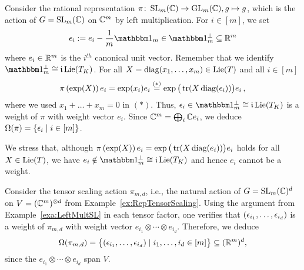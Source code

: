 

\begin{example}  \label{exa:LeftMultSL}
	Consider the rational representation $\pi \colon \operatorname{SL}_m(\mathbb C) \to \operatorname{GL}_m(\mathbb C), g \mapsto g$, which is the action of $G = \operatorname{SL}_m(\mathbb C)$ on $\mathbb C^m$ by left multiplication. For $i \in [m]$, we set
	\begin{equation}\label{eq:defnEps-i} 
		\eps_{i} := e_i - \frac{1}{m} \ones_m \in \onePerp \subseteq \RR^m
	\end{equation}
	where $e_i \in \mathbb R^m$ is the $i^{th}$ canonical unit vector. Remember that we identify $\onePerp \cong \imag \Lie(T_K)$.
	For all $X = \operatorname{diag}(x_1, \ldots, x_m) \in \operatorname{Lie}(T)$ and all $i \in [m]$
	\begin{align*}
		\pi \left( \exp(X)\right) e_i = \exp(x_i) e_i \overset{(*)}{=} \exp \big( \operatorname{tr}(X \operatorname{diag}(\epsilon_i)) \big) e_i \, ,
	\end{align*}
	where we used $x_1 + \ldots + x_m = 0$ in $(*)$. Thus, $\eps_i \in \onePerp \cong \imag \Lie(T_K)$ is a weight of $\pi$ with weight vector $e_i$. Since $\mathbb C^m = \bigoplus_i \mathbb C e_i$, we deduce
	$\Omega(\pi) = \lbrace \epsilon_i  \mid i \in [m] \rbrace$.
	
	We stress that, although $\pi \left( \exp(X)\right) e_i = \exp \big( \operatorname{tr}(X \operatorname{diag}(e_i)) \big) e_i$ holds for all $X \in \operatorname{Lie}(T)$, we have $e_i \notin \onePerp \cong \imag \Lie(T_K)$ and hence $e_i$ cannot be a weight.
	\hfill\exSymbol
\end{example}

\begin{example} \label{ex:WeightsTensorScaling}
	Consider the tensor scaling action $\pi_{m,d}$, i.e., the natural action of $G = \operatorname{SL}_m(\mathbb C)^d$ on $V = (\mathbb C^m)^{\otimes d}$ from Example~\ref{ex:RepTensorScaling}. Using the argument from Example~\ref{exa:LeftMultSL} in each tensor factor, one verifies that $(\epsilon_{i_1}, \ldots, \epsilon_{i_d})$ is a weight of $\pi_{m,d}$ with weight vector $e_{i_1} \otimes \cdots \otimes e_{i_d}$. Therefore, we deduce
		\[ \Omega(\pi_{m,d}) = \big\{ (\epsilon_{i_1}, \ldots, \epsilon_{i_d}) \mid i_1,\ldots,i_d \in [m] \big\}  \subseteq (\mathbb R^m)^d ,\]
	since the $e_{i_1} \otimes \cdots \otimes e_{i_d}$ span $V$.
	\hfill\exSymbol
\end{example}


